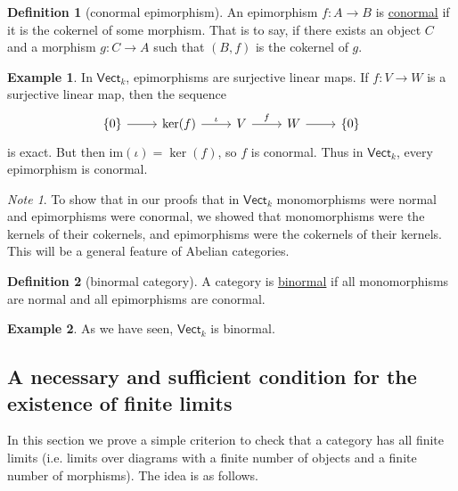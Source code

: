 \documentclass[a4paper,10pt]{scrreprt}
\newcommand{\defn}[1]{\ul{#1}}
\theoremstyle{definition}
\newtheorem{definition}{Definition}[section]
\newtheorem{example}{Example}[section]
\theoremstyle{plain}
\theoremstyle{remark}
\newtheorem{note}{Note}[section]
\begin{document}
\begin{definition}[conormal epimorphism]
  \label{def:conormalepimorphism}
  An epimorphism $f\colon A \to B$ is \defn{conormal} if it is the cokernel of some morphism. That is to say, if there exists an object $C$ and a morphism $g\colon C \to A$ such that $(B, f)$ is the cokernel of $g$.
\end{definition}

\begin{example}
  In $\mathsf{Vect}_{k}$, epimorphisms are surjective linear maps. If $f\colon V \to W$ is a surjective linear map, then the sequence
  \begin{equation*}
    \begin{tikzcd}
      \{0\} \arrow[r] & \ker(f) \arrow[r, "\iota"] & V \arrow[r, "f"] & W \arrow[r] & \{0\}
    \end{tikzcd}
  \end{equation*}
  is exact. But then $\mathrm{im}(\iota) = \ker(f)$, so $f$ is conormal. Thus in $\mathsf{Vect}_{k}$, every epimorphism is conormal.
\end{example}

\begin{note}
  To show that in our proofs that in $\mathsf{Vect}_{k}$ monomorphisms were normal and epimorphisms were conormal, we showed that monomorphisms were the kernels of their cokernels, and epimorphisms were the cokernels of their kernels. This will be a general feature of Abelian categories.
\end{note}

\begin{definition}[binormal category]
  \label{def:binormalcategory}
  A category is \defn{binormal} if all monomorphisms are normal and all epimorphisms are conormal.
\end{definition}

\begin{example}
  As we have seen, $\mathsf{Vect}_{k}$ is binormal.
\end{example}

\subsection{A necessary and sufficient condition for the existence of finite limits}
In this section we prove a simple criterion to check that a category has all finite limits (i.e. limits over diagrams with a finite number of objects and a finite number of morphisms). The idea is as follows.
\end{document}

